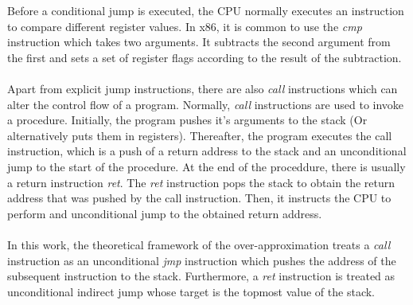 \documentclass{kththesis}
\begin{document}
Before a conditional jump is executed, the CPU normally executes an instruction to compare different register values. In x86, it is common to use the \textit{cmp} instruction which takes two arguments. It subtracts the second argument from the first and sets a set of register flags according to the result of the subtraction. %
\\ \\
Apart from explicit jump instructions, there are also \textit{call} instructions which can alter the control flow of a program. Normally, \textit{call} instructions are used to invoke a procedure. Initially, the program pushes it's arguments to the stack (Or alternatively puts them in registers). Thereafter, the program executes the call instruction, which is a push of a return address to the stack and an unconditional jump to the start of the procedure. At the end of the proceddure, there is usually a return instruction \textit{ret}. The \textit{ret} instruction pops the stack to obtain the return address that was pushed by the call instruction. Then, it instructs the CPU to perform and unconditional jump to the obtained return address. 
\\ \\ 
In this work, the theoretical framework of the over-approximation treats a \textit{call} instruction as an unconditional \textit{jmp} instruction which pushes the address of the subsequent instruction to the stack. Furthermore, a \textit{ret} instruction is treated as unconditional indirect jump whose target is the topmost value of the stack.
\end{document}
